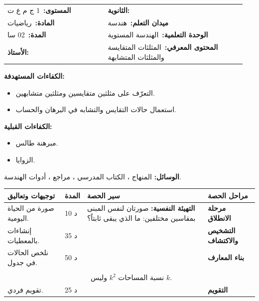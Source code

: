 \documentclass[12pt,a4paper]{article}
\makeatletter
\newenvironment{LTR}{\begin{otherlanguage}{english}}{\end{otherlanguage}}
\newcommand{\ar}[1]{\foreignlanguage{arabic}{#1}}
\newcommand{\Phase}[1]{\textbf{#1}}
\newcommand{\Fld}[2]{\textbf{#1:}\ #2}
\newcommand{\ModhHead}[9]{%
\begin{LTR}
\begin{tcolorbox}[enhanced,colback=white,colframe=cThm!85!black,arc=4mm,boxrule=1pt,top=14pt,bottom=6pt,left=8pt,right=8pt,
 overlay={\node[fill=cThm!85!black,text=white,rounded corners=3mm,inner xsep=14pt,inner ysep=4pt,font=\large\bfseries] at ([yshift=0pt]frame.north){\ar{مذكرة رقم #1}};},
 before upper={\selectlanguage{arabic}}]
\begin{tabular}{@{}p{0.4\linewidth}p{0.55\linewidth}@{}}
\Fld{المستوى}{#2} & \Fld{الثانوية}{\dotfill}\\[3pt]
\Fld{المادة}{رياضيات} & \Fld{ميدان التعلم}{#3}\\[3pt]
\Fld{المدة}{#5} & \Fld{الوحدة التعلمية}{#4}\\[3pt]
\Fld{الأستاذ}{\dotfill} & \Fld{المحتوى المعرفي}{#6}\\
\end{tabular}
\end{tcolorbox}
\begin{tcolorbox}[enhanced,colback=white,colframe=cThm!85!black,arc=3mm,boxrule=0.8pt,sidebyside,sidebyside align=top,lefthand ratio=0.5,
 segmentation style={dashed,cThm!60},before upper={\selectlanguage{arabic}},before lower={\selectlanguage{arabic}}]
\textbf{الكفاءات المستهدفة:}\par #8
\tcblower
\textbf{الكفاءات القبلية:}\par #7
\end{tcolorbox}
\end{LTR}
\par\smallskip\textbf{الوسائل:} #9\par\smallskip}
\newenvironment{Sayr}{%
\begin{LTR}\renewcommand{\arraystretch}{1.25}
\begin{longtable}{|p{0.17\textwidth}|>{\centering\arraybackslash}p{0.06\textwidth}|p{0.53\textwidth}|>{\centering\arraybackslash}p{0.12\textwidth}|}
\hline\rowcolor{cThm!12}\ar{\textbf{توجيهات وتعاليق}} & \ar{\textbf{المدة}} & \ar{\textbf{سير الحصة}} & \ar{\textbf{مراحل الحصة}}\\\hline\endhead
\hline\endfoot}{\end{longtable}\end{LTR}}
\newcommand{\Row}[4]{\ar{\small #4} & \ar{#3} & \ar{#2} & \cellcolor{cThm!8}\ar{\Phase{#1}}\\\hline}
\newcommand{\Lab}[2]{\foreignlanguage{english}{\tcbox[on line,colback=#1,colframe=#1,boxrule=0pt,arc=2pt,boxsep=1pt,left=5pt,right=5pt,top=1pt,bottom=1pt]{\ar{\textcolor{white}{\textbf{#2}}}}}}
\newcommand{\ck}{\ensuremath{{\color{cRem}\checkmark}}}
\makeatother
\begin{document}
\newpage
\ModhHead{40}{1 ج م ع ت}{هندسة}{الهندسة المستوية}{02 سا}{المثلثات المتقايسة والمثلثات المتشابهة}%
{\begin{itemize}\item مبرهنة طالس.\item الزوايا.\end{itemize}}%
{\begin{itemize}\item التعرّف على مثلثين متقايسين ومثلثين متشابهين.\item استعمال حالات التقايس والتشابه في البرهان والحساب.\end{itemize}}%
{المنهاج ، الكتاب المدرسي ، مراجع ، أدوات الهندسة.}
\begin{Sayr}
\Row{مرحلة الانطلاق}{%
\textbf{التهيئة النفسية:} صورتان لنفس المبنى بمقاسين مختلفين: ما الذي يبقى ثابتاً؟}{10 د}{صورة من الحياة اليومية.}
\Row{التشخيص والاكتشاف}{%
\Lab{cEx}{مناقشة النشاطين 06 صفحة 210 و 07 صفحة 211}\par\ck\ بإنشاء مثلثات بمعطيات الجدول نلاحظ أن ثلاثة أضلاع ، أو ضلعين والزاوية المحصورة ، أو ضلعاً وزاويتين تحدد المثلث: \textbf{حالات التقايس}.\par
\ck\ مثلثان لهما نفس الزوايا: أضلاعهما متناسبة: \textbf{مثلثان متشابهان}.\par
}{35 د}{إنشاءات بالمعطيات.}
\Row{بناء المعارف}{%
\Lab{cThm}{حالات التقايس}\ (ض ، ض ، ض) ؛ (ض ، ز ، ض) ؛ (ز ، ض ، ز).\par\Lab{cThm}{حالات التشابه}\ زاويتان متقايستان مثنى مثنى ؛ أو أضلاع متناسبة ؛ أو زاوية متقايسة وضلعاها متناسبان.\par}{50 د}{نلخص الحالات في جدول.}
\Row{}{%
\Lab{cThm}{خاصية}\ إذا كان مثلثان متشابهين بنسبة $k$ فإن مساحتيهما $S^{\prime}=k^2S$.\par\Lab{cEx}{مثال}\ $M\in[AB]$ ، $N\in[AC]$ و $(MN)\parallel(BC)$ ، $AM=2$ ، $AB=5$: $AMN$ و $ABC$ متشابهان بنسبة $\dfrac25$ ، وإذا كانت مساحة $ABC$ هي $50$ cm² فمساحة $AMN$ هي $\Big(\dfrac25\Big)^2\times50=8$ cm².\par}{}{}
\Row{}{%
\Lab{cThm!80!black}{حذار}\ نسبة المساحات $k^2$ وليس $k$.}{}{}
\Row{التقويم}{%
\Lab{cEx}{تطبيق}\par $ABCD$ متوازي أضلاع مركزه $O$. بيّن أن المثلثين $OAB$ و $OCD$ متقايسان واستنتج $AB=CD$.\par\textbf{الحل:} $OA=OC$ ، $OB=OD$ و $\widehat{AOB}=\widehat{COD}$ (متقابلتان بالرأس): الحالة (ض ، ز ، ض).\par\textbf{واجب منزلي:} تمارين من الكتاب المدرسي.\par\smallskip\textbf{ملاحظات حول سير الحصة:} \dotfill}{25 د}{تقويم فردي.}
\end{Sayr}
\end{document}
